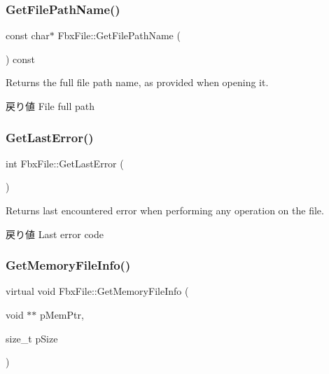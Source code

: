 \subsubsection{\texorpdfstring{Get\+File\+Path\+Name()}{GetFilePathName()}}
{\footnotesize\ttfamily const char$\ast$ Fbx\+File\+::\+Get\+File\+Path\+Name (\begin{DoxyParamCaption}{ }\end{DoxyParamCaption}) const}

Returns the full file path name, as provided when opening it. \begin{DoxyReturn}{戻り値}
File full path 
\end{DoxyReturn}
\mbox{\label{class_fbx_file_a797c6a169a44de27d96d991e884dafed}} 
\subsubsection{\texorpdfstring{Get\+Last\+Error()}{GetLastError()}}
{\footnotesize\ttfamily int Fbx\+File\+::\+Get\+Last\+Error (\begin{DoxyParamCaption}{ }\end{DoxyParamCaption})}

Returns last encountered error when performing any operation on the file. \begin{DoxyReturn}{戻り値}
Last error code 
\end{DoxyReturn}
\mbox{\label{class_fbx_file_ab603c8d30f989a0d195cc720181b18b3}} 
\subsubsection{\texorpdfstring{Get\+Memory\+File\+Info()}{GetMemoryFileInfo()}}
{\footnotesize\ttfamily virtual void Fbx\+File\+::\+Get\+Memory\+File\+Info (\begin{DoxyParamCaption}\item[{void $\ast$$\ast$}]{p\+Mem\+Ptr,  }\item[{size\+\_\+t}]{p\+Size }\end{DoxyParamCaption})\hspace{0.3cm}{\ttfamily [virtual]}}

